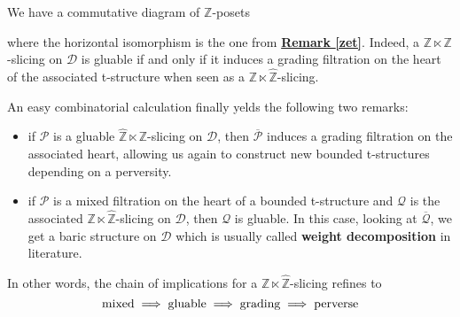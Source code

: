 \begin{rem}
We have a commutative diagram of $\mathbb{Z}$-posets 
\begin{center}
\end{center}
where the horizontal isomorphism is the one from \hyperref[zet]{\textbf{Remark \ref*{zet}}}. Indeed, a $\mathbb{Z} \ltimes \mathbb{Z}$-slicing on $\mathscr{D}$ is gluable if and only if it induces a grading filtration on the heart of the associated t-structure when seen as a $\mathbb{Z} \ltimes \hat{\mathbb{Z}}$-slicing. 
\end{rem} 

An easy combinatorial calculation finally yelds the following two remarks: 
\begin{itemize}
\item  if $\mathscr{P}$ is a gluable $\hat{\mathbb{Z}} \ltimes \mathbb{Z}$-slicing on $\mathscr{D}$, then $\overline{\mathscr{P}}$ induces a grading filtration on the associated heart, allowing us again to construct new bounded t-structures depending on a perversity. 
\item if $\mathscr{P}$ is a mixed filtration on the heart of a bounded t-structure and $\mathscr{Q}$ is the associated $\mathbb{Z} \ltimes \hat{\mathbb{Z}}$-slicing on $\mathscr{D}$, then $\mathscr{Q}$ is gluable. In this case, looking at $\overline{\mathscr{Q}}$, we get a baric structure on $\mathscr{D}$ which is usually called \textbf{weight decomposition} in literature. 
\end{itemize}
In other words, the chain of implications for a $\mathbb{Z} \ltimes \hat{\mathbb{Z}}$-slicing refines to 
$$\textnormal{mixed} \implies \textnormal{gluable} \implies \textnormal{grading} \implies \textnormal{perverse} $$

